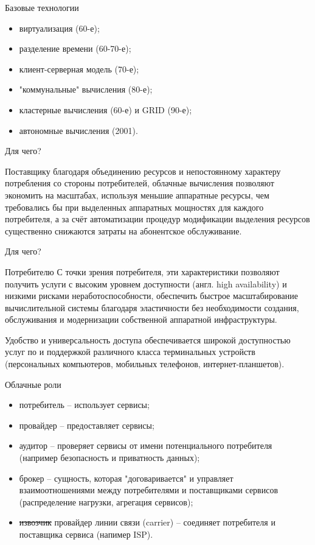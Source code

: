 \begin{frame}{Базовые технологии}
	\begin{itemize}
		\item виртуализация (60-е);
		\item разделение времени (60-70-е);
		\item клиент-серверная модель (70-е);
		\item "коммунальные" вычисления (80-е);
		\item кластерные вычисления (60-е) и GRID (90-е);
		\item автономные вычисления (2001).
	\end{itemize}
\end{frame}


\begin{frame}{Для чего?}
	\begin{block}{Поставщику}
благодаря объединению ресурсов и непостоянному характеру потребления со стороны потребителей,  облачные вычисления позволяют экономить на масштабах,  используя меньшие аппаратные ресурсы,  чем требовались бы при выделенных аппаратных мощностях для каждого потребителя,  а за счёт автоматизации процедур модификации выделения ресурсов существенно снижаются затраты на абонентское обслуживание.
	\end{block}
\end{frame}

\begin{frame}{Для чего?}
	\begin{block}{Потребителю}
С точки зрения потребителя,  эти характеристики позволяют получить услуги с высоким уровнем доступности (англ. high availability) и низкими рисками неработоспособности,  обеспечить быстрое масштабирование вычислительной системы благодаря эластичности без необходимости создания,  обслуживания и модернизации собственной аппаратной инфраструктуры.

Удобство и универсальность доступа обеспечивается широкой доступностью услуг по и поддержкой различного класса терминальных устройств (персональных компьютеров,  мобильных телефонов,  интернет-планшетов).
	\end{block}
\end{frame}

\begin{frame}{Облачные роли}
	\begin{itemize}
		\item потребитель -- использует сервисы;
		\item провайдер -- предоставляет сервисы;
		\item аудитор -- проверяет сервисы от имени потенциального потребителя (например безопасность и приватность данных);
		\item брокер -- сущность, которая "договаривается" и управляет взаимоотношениями между потребителями и поставщиками сервисов (распределение нагрузки, агрегация сервисов);
		\item \sout{извозчик} провайдер линии связи (carrier) -- соединяет потребителя и поставщика сервиса (напимер ISP).
	\end{itemize}
\end{frame}



